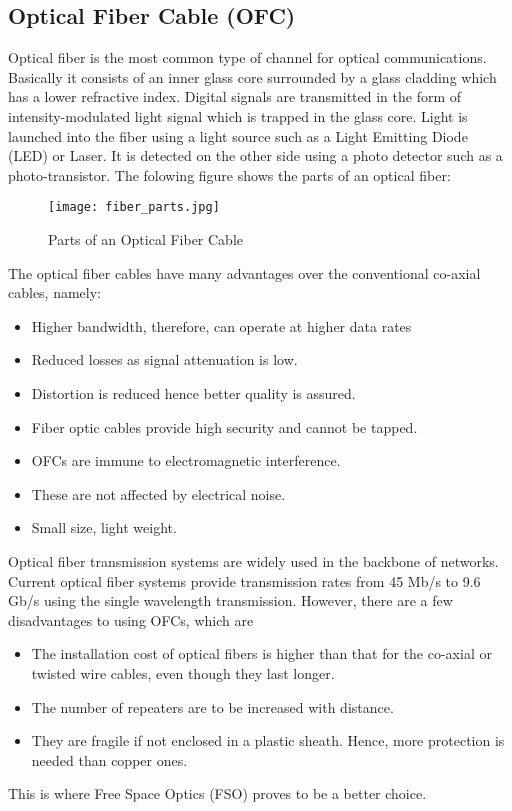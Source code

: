 \documentclass[hidelinks, 12pt]{report}
\begin{document}
\subsection{Optical Fiber Cable (OFC)}
\justify
Optical fiber is the most common type of channel for optical communications. Basically it consists of an inner glass core surrounded by a glass cladding which has a lower refractive index. Digital signals are transmitted in the form of intensity-modulated light signal which is trapped in the glass core. Light is launched into the fiber using a light source such as a Light Emitting Diode (LED) or Laser. It is detected on the other side using a photo detector such as a photo-transistor. 
The folowing figure shows the parts of an optical fiber:
\begin{figure}[H]
\centering
\texttt{[image: fiber\_parts.jpg]}
\caption[Parts of an Optical Fiber Cable]{Parts of an Optical Fiber Cable}
\label{Parts of OFC}
\end{figure}

The optical fiber cables have many advantages over the conventional co-axial cables, namely:
\begin{itemize}
  \item Higher bandwidth, therefore, can operate at higher data rates
  \item Reduced losses as signal attenuation is low.
  \item Distortion is reduced hence better quality is assured.
  \item Fiber optic cables provide high security and cannot be tapped.
  \item OFCs are immune to electromagnetic interference.
  \item These are not affected by electrical noise.
  \item Small size, light weight.
\end{itemize}
 Optical fiber transmission systems are widely used in the backbone of networks. Current optical fiber systems provide transmission rates from 45 Mb/s to 9.6 Gb/s using the single wavelength transmission.
 However, there are a few disadvantages to using OFCs, which are
 \begin{itemize}
\item The installation cost of optical fibers is higher than that for the co-axial or twisted wire cables, even though they last longer.
\item The number of repeaters are to be increased with distance.
\item They are fragile if not enclosed in a plastic sheath. Hence, more protection is needed than copper ones. 
\end{itemize}
 This is where Free Space Optics (FSO) proves to be a better choice.
\end{document}
